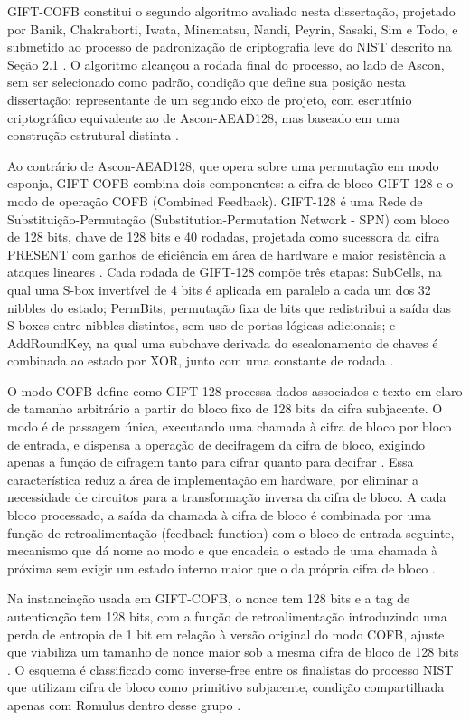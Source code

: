 GIFT-COFB constitui o segundo algoritmo avaliado nesta dissertação, projetado por Banik, Chakraborti, Iwata, Minematsu, Nandi, Peyrin, Sasaki, Sim e Todo, e submetido ao processo de padronização de criptografia leve do NIST descrito na Seção 2.1 \cite{Banik2021}. O algoritmo alcançou a rodada final do processo, ao lado de Ascon, sem ser selecionado como padrão, condição que define sua posição nesta dissertação: representante de um segundo eixo de projeto, com escrutínio criptográfico equivalente ao de Ascon-AEAD128, mas baseado em uma construção estrutural distinta \cite{Turan2023NISTLWCFinal}.

Ao contrário de Ascon-AEAD128, que opera sobre uma permutação em modo esponja, GIFT-COFB combina dois componentes: a cifra de bloco GIFT-128 e o modo de operação COFB (Combined Feedback). GIFT-128 é uma Rede de Substituição-Permutação (Substitution-Permutation Network - SPN) com bloco de 128 bits, chave de 128 bits e 40 rodadas, projetada como sucessora da cifra PRESENT com ganhos de eficiência em área de hardware e maior resistência a ataques lineares \cite{Banik2017}. Cada rodada de GIFT-128 compõe três etapas: SubCells, na qual uma S-box invertível de 4 bits é aplicada em paralelo a cada um dos 32 nibbles do estado; PermBits, permutação fixa de bits que redistribui a saída das S-boxes entre nibbles distintos, sem uso de portas lógicas adicionais; e AddRoundKey, na qual uma subchave derivada do escalonamento de chaves é combinada ao estado por XOR, junto com uma constante de rodada \cite{Banik2017}.

O modo COFB define como GIFT-128 processa dados associados e texto em claro de tamanho arbitrário a partir do bloco fixo de 128 bits da cifra subjacente. O modo é de passagem única, executando uma chamada à cifra de bloco por bloco de entrada, e dispensa a operação de decifragem da cifra de bloco, exigindo apenas a função de cifragem tanto para cifrar quanto para decifrar \cite{Banik2021}. Essa característica reduz a área de implementação em hardware, por eliminar a necessidade de circuitos para a transformação inversa da cifra de bloco. A cada bloco processado, a saída da chamada à cifra de bloco é combinada por uma função de retroalimentação (feedback function) com o bloco de entrada seguinte, mecanismo que dá nome ao modo e que encadeia o estado de uma chamada à próxima sem exigir um estado interno maior que o da própria cifra de bloco \cite{Banik2021}.

Na instanciação usada em GIFT-COFB, o nonce tem 128 bits e a tag de autenticação tem 128 bits, com a função de retroalimentação introduzindo uma perda de entropia de 1 bit em relação à versão original do modo COFB, ajuste que viabiliza um tamanho de nonce maior sob a mesma cifra de bloco de 128 bits \cite{Banik2021}. O esquema é classificado como inverse-free entre os finalistas do processo NIST que utilizam cifra de bloco como primitivo subjacente, condição compartilhada apenas com Romulus dentro desse grupo \cite{Turan2023NISTLWCFinal}.

